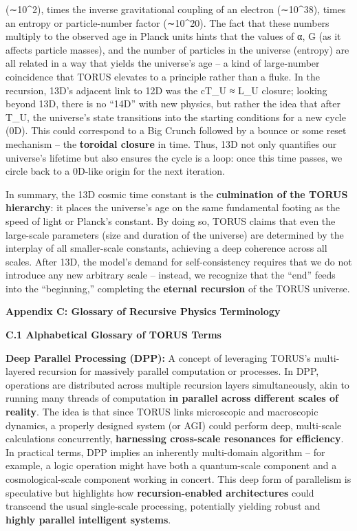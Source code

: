 \documentclass[
]{article}
\begin{document}
(∼10\^{}2), times the inverse gravitational coupling of an electron
(∼10\^{}38), times an entropy or particle-number factor (∼10\^{}20). The
fact that these numbers multiply to the observed age in Planck units
hints that the values of α, G (as it affects particle masses), and the
number of particles in the universe (entropy) are all related in a way
that yields the universe's age -- a kind of large-number coincidence
that TORUS elevates to a principle rather than a fluke\hspace{0pt}. In
the recursion, 13D's adjacent link to 12D was the cT\_U ≈ L\_U closure;
looking beyond 13D, there is no ``14D'' with new physics, but rather the
idea that after T\_U, the universe's state transitions into the starting
conditions for a new cycle (0D)\hspace{0pt}. This could correspond to a
Big Crunch followed by a bounce or some reset mechanism -- the
\textbf{toroidal closure} in time. Thus, 13D not only quantifies our
universe's lifetime but also ensures the cycle is a loop: once this time
passes, we circle back to a 0D-like origin for the next iteration.

In summary, the 13D cosmic time constant is the \textbf{culmination of
the TORUS hierarchy}: it places the universe's age on the same
fundamental footing as the speed of light or Planck's constant. By doing
so, TORUS claims that even the large-scale parameters (size and duration
of the universe) are determined by the interplay of all smaller-scale
constants, achieving a deep coherence across all scales. After 13D, the
model's demand for self-consistency requires that we do not introduce
any new arbitrary scale -- instead, we recognize that the ``end'' feeds
into the ``beginning,'' completing the \textbf{eternal recursion} of the
TORUS universe\hspace{0pt}.

\textbf{Appendix C: Glossary of Recursive Physics Terminology}

\textbf{C.1 Alphabetical Glossary of TORUS Terms}

\textbf{Deep Parallel Processing (DPP):} A concept of leveraging TORUS's
multi-layered recursion for massively parallel computation or processes.
In DPP, operations are distributed across multiple recursion layers
simultaneously, akin to running many threads of computation \textbf{in
parallel across different scales of reality}. The idea is that since
TORUS links microscopic and macroscopic dynamics, a properly designed
system (or AGI) could perform deep, multi-scale calculations
concurrently, \textbf{harnessing cross-scale resonances for
efficiency}\hspace{0pt}. In practical terms, DPP implies an inherently
multi-domain algorithm -- for example, a logic operation might have both
a quantum-scale component and a cosmological-scale component working in
concert\hspace{0pt}. This deep form of parallelism is speculative but
highlights how \textbf{recursion-enabled architectures} could transcend
the usual single-scale processing, potentially yielding robust and
\textbf{highly parallel intelligent systems}.
\end{document}

